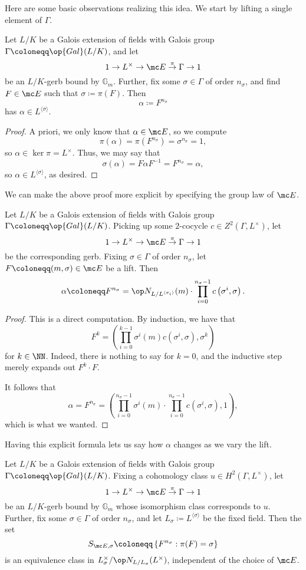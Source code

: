 \documentclass{article}
\numberwithin{equation}{section}
\begin{document}
Here are some basic observations realizing this idea. We start by lifting a single element of $\Gamma$.
\begin{lemma} \label{lem:constructalpha}
	Let $L/K$ be a Galois extension of fields with Galois group $\Gamma\coloneqq\op{Gal}(L/K)$, and let 
	\[1\to L^\times\to\mc E\stackrel\pi\to\Gamma\to1\]
	be an $L/K$-gerb bound by $\mathbb G_m$. Further, fix some $\sigma\in\Gamma$ of order $n_\sigma$, and find $F\in\mc E$ such that $\sigma\coloneqq\pi(F)$. Then
	\[\alpha\coloneqq F^{n_\sigma}\]
	has $\alpha\in L^{\langle\sigma\rangle}$.
\end{lemma}
\begin{proof}
	A priori, we only know that $\alpha\in\mc E$, so we compute
	\[\pi(\alpha)=\pi\left(F^{n_\sigma}\right)=\sigma^{n_\sigma}=1,\]
	so $\alpha\in\ker\pi=L^\times$. Thus, we may say that
	\[\sigma(\alpha)=F\alpha F^{-1}=F^{n_\sigma}=\alpha,\]
	so $\alpha\in L^{\langle\sigma\rangle}$, as desired.
\end{proof}
We can make the above proof more explicit by specifying the group law of $\mc E$.
\begin{lemma} \label{lem:explicitalpha}
	Let $L/K$ be a Galois extension of fields with Galois group $\Gamma\coloneqq\op{Gal}(L/K)$. Picking up some $2$-cocycle $c\in Z^2(\Gamma,L^\times)$, let
	\[1\to L^\times\to\mc E\stackrel\pi\to\Gamma\to1\]
	be the corresponding gerb. Fixing $\sigma\in\Gamma$ of order $n_\sigma$, let $F\coloneqq(m,\sigma)\in\mc E$ be a lift. Then
	\[\alpha\coloneqq F^{n_\sigma}=\op N_{L/L^{\langle\sigma_i\rangle}}(m)\cdot\prod_{i=0}^{n_\sigma-1}c\left(\sigma^i,\sigma\right).\]
\end{lemma}
\begin{proof}
	This is a direct computation. By induction, we have that
	\[F^k=\left(\prod_{i=0}^{k-1}\sigma^i(m)c\left(\sigma^i,\sigma\right),\sigma^k\right)\]
	for $k\in\NN$. Indeed, there is nothing to say for $k=0$, and the inductive step merely expands out $F^k\cdot F$.

	It follows that
	\[\alpha=F^{n_\sigma}=\left(\prod_{i=0}^{n_\sigma-1}\sigma^i(m)\cdot\prod_{i=0}^{n_\sigma-1}c\left(\sigma^i,\sigma\right),1\right),\]
	which is what we wanted.
\end{proof}
Having this explicit formula lets us say how $\alpha$ changes as we vary the lift.
\begin{prop} \label{prop:findallalpha}
	Let $L/K$ be a Galois extension of fields with Galois group $\Gamma\coloneqq\op{Gal}(L/K)$. Fixing a cohomology class $u\in H^2(\Gamma,L^\times)$, let 
	\[1\to L^\times\to\mc E\stackrel\pi\to\Gamma\to1\]
	be an $L/K$-gerb bound by $\mathbb G_m$ whose isomorphism class corresponds to $u$. Further, fix some $\sigma\in\Gamma$ of order $n_\sigma$, and let $L_\sigma\coloneqq L^{\langle\sigma\rangle}$ be the fixed field. Then the set
	\[S_{\mc E,\sigma}\coloneqq\left\{F^{n_\sigma}:\pi(F)=\sigma\right\}\]
	is an equivalence class in $L_\sigma^\times/\op N_{L/L_\sigma}(L^\times)$, independent of the choice of $\mc E$.
\end{prop}
\end{document}
